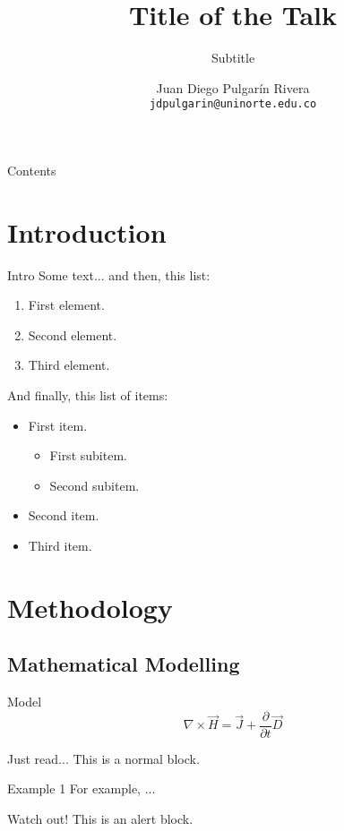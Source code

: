 \documentclass[hideothersubsections]{beamer}
\title{Title of the Talk}
\subtitle{Subtitle}
\author[JP]{Juan Diego Pulgarín Rivera\\\texttt{jdpulgarin@uninorte.edu.co}}
\institute{27th International Symposium of Prime Numbers}
\begin{document}
\begin{frame}[plain]
\titlepage
\end{frame}

\begin{frame}[plain]{Contents}
	\tableofcontents
\end{frame}

\section{Introduction}
\begin{frame}{Intro}
	Some text... and then, this list:
	\begin{enumerate}
		\item First element.
		\item Second element.
		\item Third element.
	\end{enumerate}
	
	And finally, this list of items:
	\begin{itemize}
		\item First item.
		\begin{itemize}
			\item First subitem.
			\item Second subitem.
		\end{itemize}
		\item Second item.
		\item Third item.
	\end{itemize}
\end{frame}

\section{Methodology}
\subsection{Mathematical Modelling}
\begin{frame}{Model}
	\begin{equation}
		\nabla\times\vec{H} = \vec{J} + \frac{\partial}{\partial t} \vec{D}
	\end{equation}
	\begin{block}{Just read...}
		This is a normal block.
	\end{block}
	\begin{exampleblock}{Example 1}
		For example, ... 
	\end{exampleblock}
	\begin{alertblock}{Watch out!}
		This is an alert block.
	\end{alertblock}
\end{frame}
\end{document}
